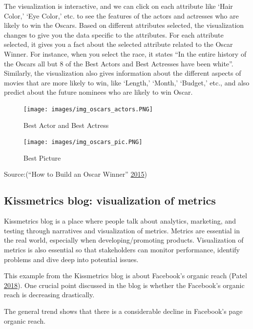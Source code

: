 \documentclass[]{book}
\begin{document}
The visualization is interactive, and we can click on each attribute like `Hair Color,' `Eye Color,' etc. to see the features of the actors and actresses who are likely to win the Oscars. Based on different attributes selected, the visualization changes to give you the data specific to the attributes. For each attribute selected, it gives you a fact about the selected attribute related to the Oscar Winner. For instance, when you select the race, it states ``In the entire history of the Oscars all but 8 of the Best Actors and Best Actresses have been white''. Similarly, the visualization also gives information about the different aspects of movies that are more likely to win, like `Length,' `Month,' `Budget,' etc., and also predict about the future nominees who are likely to win Oscar.

\begin{figure}
\centering
\texttt{[image: images/img\_oscars\_actors.PNG]}
\caption{Best Actor and Best Actress}
\end{figure}

\begin{figure}
\centering
\texttt{[image: images/img\_oscars\_pic.PNG]}
\caption{Best Picture}
\end{figure}

Source:(``How to Build an Oscar Winner'' \protect\hyperlink{ref-oscars_sowhite_chart}{2015})

\hypertarget{kissmetrics-blog-visualization-of-metrics}{%
\subsection{Kissmetrics blog: visualization of metrics}\label{kissmetrics-blog-visualization-of-metrics}}

Kissmetrics blog is a place where people talk about analytics, marketing, and testing through narratives and visualization of metrics. Metrics are essential in the real world, especially when developing/promoting products. Visualization of metrics is also essential so that stakeholders can monitor performance, identify problems and dive deep into potential issues.

This example from the Kissmetrics blog is about Facebook's organic reach (Patel \protect\hyperlink{ref-facebook_organic}{2018}). One crucial point discussed in the blog is whether the Facebook's organic reach is decreasing drastically.

The general trend shows that there is a considerable decline in Facebook's page organic reach.
\end{document}
